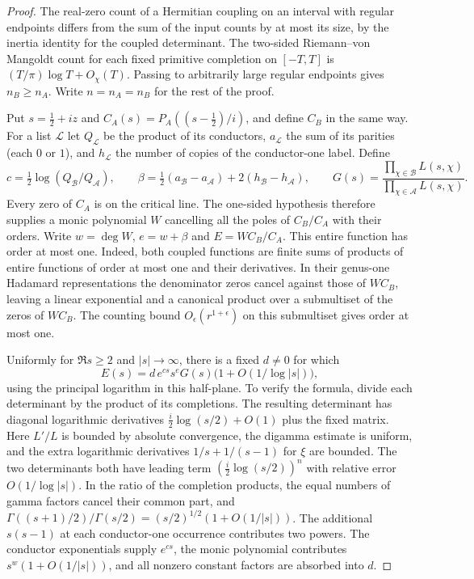 \begin{proof}
The real-zero count of a Hermitian coupling on an interval with regular endpoints differs from the sum of the input counts by at most its size, by the inertia identity for the coupled determinant. The two-sided Riemann--von Mangoldt count for each fixed primitive completion on $[-T,T]$ is $(T/\pi)\log T+O_{\chi}(T)$. Passing to arbitrarily large regular endpoints gives $n_B\ge n_A$. Write $n=n_A=n_B$ for the rest of the proof.

Put $s=\tfrac12+iz$ and $C_A(s)=P_A((s-\tfrac12)/i)$, and define $C_B$ in the same way. For a list $\mathcal L$ let $Q_{\mathcal L}$ be the product of its conductors, $a_{\mathcal L}$ the sum of its parities (each $0$ or $1$), and $h_{\mathcal L}$ the number of copies of the conductor-one label. Define
\[
 c=\tfrac12\log(Q_{\mathcal B}/Q_{\mathcal A}),\qquad
 \beta=\tfrac12(a_{\mathcal B}-a_{\mathcal A})+2(h_{\mathcal B}-h_{\mathcal A}),\qquad
 G(s)=\frac{\prod_{\chi\in\mathcal B} L(s,\chi)}{\prod_{\chi\in\mathcal A} L(s,\chi)}.
\]
Every zero of $C_A$ is on the critical line. The one-sided hypothesis therefore supplies a monic polynomial $W$ cancelling all the poles of $C_B/C_A$ with their orders. Write $w=\deg W$, $e=w+\beta$ and $E=W C_B/C_A$. This entire function has order at most one. Indeed, both coupled functions are finite sums of products of entire functions of order at most one and their derivatives. In their genus-one Hadamard representations the denominator zeros cancel against those of $W C_B$, leaving a linear exponential and a canonical product over a submultiset of the zeros of $W C_B$. The counting bound $O_\epsilon(r^{1+\epsilon})$ on this submultiset gives order at most one.

Uniformly for $\Re s\ge 2$ and $|s|\to\infty$, there is a fixed $d\ne0$ for which
\begin{equation}\label{eq:blind-asymptotic}
 E(s)=d\,e^{cs}s^e G(s)\bigl(1+O(1/\log |s|)\bigr),
\end{equation}
using the principal logarithm in this half-plane. To verify the formula, divide each determinant by the product of its completions. The resulting determinant has diagonal logarithmic derivatives $\tfrac i2\log(s/2)+O(1)$ plus the fixed matrix. Here $L'/L$ is bounded by absolute convergence, the digamma estimate is uniform, and the extra logarithmic derivatives $1/s+1/(s-1)$ for $\xi$ are bounded. The two determinants both have leading term $(\tfrac i2\log(s/2))^n$ with relative error $O(1/\log|s|)$. In the ratio of the completion products, the equal numbers of gamma factors cancel their common part, and $\Gamma((s+1)/2)/\Gamma(s/2)=(s/2)^{1/2}(1+O(1/|s|))$. The additional $s(s-1)$ at each conductor-one occurrence contributes two powers. The conductor exponentials supply $e^{cs}$, the monic polynomial contributes $s^w(1+O(1/|s|))$, and all nonzero constant factors are absorbed into $d$.


\end{proof}
